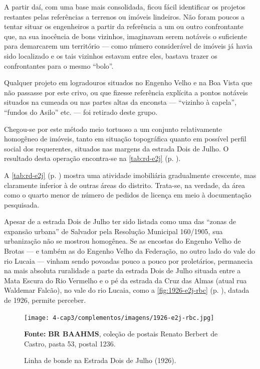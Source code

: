 A partir daí, com uma base mais consolidada, ficou fácil identificar os projetos restantes pelas referências a terrenos ou imóveis lindeiros. Não foram poucos a tentar situar os engenheiros a partir da referência a um ou outro confrontante que, na sua inocência de bons vizinhos, imaginavam serem notáveis o suficiente para demarcarem um território --- como número considerável de imóveis já havia sido localizado e os tais vizinhos estavam entre eles, bastava trazer os confrontantes para o mesmo ``bolo''. 

Qualquer projeto em logradouros situados no Engenho Velho e na Boa Vista que não passasse por este crivo, ou que fizesse referência explícita a pontos notáveis situados na cumeada ou nas partes altas da enconsta --- ``vizinho à capela'', ``fundos do Asilo'' etc. --- foi retirado deste grupo. 

Chegou-se por este método meio tortuoso a um conjunto relativamente homogêneo de imóveis, tanto em situação topográfica quanto em possível perfil social dos requerentes, situados nas margens da estrada Dois de Julho. O resultado desta operação encontra-se na \autoref{tab:rd-e2j} (p. \pageref{tab:rd-e2j}).





A \autoref{tab:rd-e2j} (p. \pageref{tab:rd-e2j}) mostra uma atividade imobiliária gradualmente crescente, mas claramente inferior à de outras áreas do distrito. Trata-se, na verdade, da área como o quarto menor de número de pedidos de licença em meio à documentação pesquisada. 

Apesar de a estrada Dois de Julho ter sido listada como uma das ``zonas de expansão urbana'' de Salvador pela Resolução Municipal 160/1905, sua urbanização não se mostrou homogênea. Se as encostas do Engenho Velho de Brotas --- e também as do Engenho Velho da Federação, no outro lado do vale do rio Lucaia --- vinham sendo povoadas pouco a pouco por proletários, permanecia na mais absoluta ruralidade a parte da estrada Dois de Julho situada entre a Mata Escura do Rio Vermelho e o pé da estrada da Cruz das Almas (atual rua Waldemar Falcão), no vale do rio Lucaia, como a \autoref{fig:1926-e2j-rbc} (p. \pageref{fig:1926-e2j-rbc}), datada de 1926, permite perceber. 

\begin{figure}[!h]
\centering
\caption{Linha de bonde na Estrada Dois de Julho (1926).}
\texttt{[image: 4-cap3/complementos/imagens/1926-e2j-rbc.jpg]}{\footnotesize \par \textbf{Fonte:} \textbf{BR BAAHMS}, coleção de postais Renato Berbert de Castro, pasta 53, postal 1236.}
\label{fig:1926-e2j-rbc}
\end{figure}

